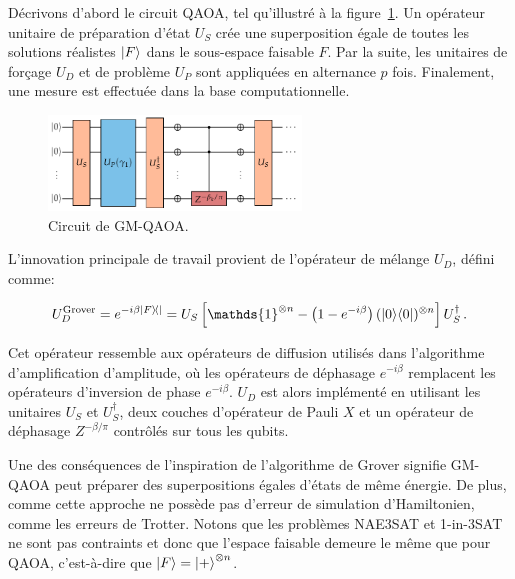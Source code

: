 Décrivons d'abord le circuit QAOA, tel qu'illustré à la figure~\ref{fig:gm-qaoa}. Un opérateur unitaire de préparation d'état $U_{S}$ crée une superposition égale de toutes les solutions réalistes $\ket{F}$ dans le sous-espace faisable $F$. Par la suite, les unitaires de forçage $U_{D}$ et de problème $U_{P}$ sont appliquées en alternance $p$ fois. Finalement, une mesure est effectuée dans la base computationnelle.

\begin{figure}[ht!]
    \centering
    \includegraphics[width=0.6\textwidth]{figures/gm-qaoa}
    \caption[Circuit de l'ansatz quantique à opérateurs alternants avec forçage de Grover]{Circuit de GM-QAOA. }
    \label{fig:gm-qaoa}
\end{figure}

L'innovation principale de travail provient de l'opérateur de mélange $U_{D}$, défini comme:

\begin{equation}
    U_D^{\mathrm{Grover}} = e^{-i \beta \ket{F}\!\bra{}} = U_{S}\left[ \mathds{1}^{\otimes n} -\left(1-e^{-i \beta}\right) (\ket{0}\!\bra{0})^{\otimes n} \right] U_{S}^{\dagger} \,.
\end{equation}

Cet opérateur ressemble aux opérateurs de diffusion utilisés dans l'algorithme d'amplification d'amplitude, où les opérateurs de déphasage $e^{-i\beta}$ remplacent les opérateurs d'inversion de phase $e^{-i\beta}$. $U_{D}$ est alors implémenté en utilisant les unitaires $U_{S}$ et $U_{S}^{\dagger}$, deux couches d'opérateur de Pauli $X$ et un opérateur de déphasage $Z^{-\beta/\pi}$ contrôlés sur tous les qubits.

Une des conséquences de l'inspiration de l'algorithme de Grover signifie GM-QAOA peut préparer des superpositions égales d'états de même énergie. De plus, comme cette approche ne possède pas d'erreur de simulation d'Hamiltonien, comme les erreurs de Trotter. Notons que les problèmes NAE3SAT et 1-in-3SAT ne sont pas contraints et donc que l'espace faisable demeure le même que pour QAOA, c'est-à-dire que $\ket{F} = \ket{+}^{\otimes n}$.



